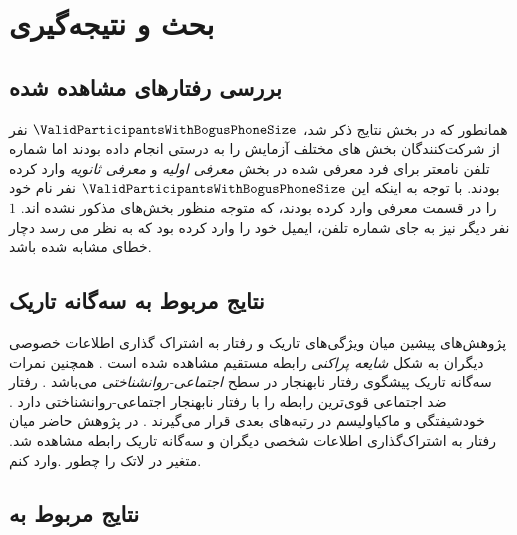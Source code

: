 \chapter{بحث و نتیجه‌گیری}
\section{بررسی رفتارهای مشاهده شده }
همانطور که در بخش نتایج ذکر شد،
$\ValidParticipantsWithBogusPhoneSize$
 نفر  از شرکت‌کنندگان 
بخش های مختلف آزمایش را به درستی انجام داده بودند اما شماره تلفن نامعتر
برای فرد معرفی شده در بخش‌ 
\textit{معرفی اولیه}
و
\textit{معرفی ثانویه}
وارد کرده بودند. با توجه به اینکه این $\ValidParticipantsWithBogusPhoneSize$
نفر نام
خود را در قسمت معرفی وارد کرده بودند، که متوجه منظور بخش‌های مذکور نشده اند.
$1$
نفر دیگر نیز به جای شماره تلفن، ایمیل خود را وارد کرده بود که به نظر می رسد دچار خطای مشابه 
شده باشد. 
\section{نتایج مربوط به سه‌گانه تاریک}
پژوهش‌های پیشین میان ویژگی‌های تاریک و رفتار
به اشتراک گذاری اطلاعات خصوصی دیگران به شکل
\textit{
    شایعه پراکنی
}
رابطه مستقیم مشاهده شده است
\!\citep{hartungBetterItsReputation2019}
\!.
همچنین نمرات سه‌گانه تاریک پیشگوی رفتار نابهنجار در سطح
\textit{
    اجتماعی-روانشناختی
}
می‌باشد
\!\citep{murisMalevolentSideHuman2017}
\!.
رفتار ضد اجتماعی قوی‌ترین رابطه را با رفتار نابهنجار اجتماعی-روانشناختی دارد
\!. خودشیفتگی
و ماکیاولیسم
در رتبه‌های بعدی قرار می‌گیرند
\!.
در پژوهش حاضر میان رفتار به اشتراک‌گذاری اطلاعات شخصی دیگران و سه‌گانه تاریک رابطه مشاهده شد.
متغیر در لاتک را چطور .وارد کنم.
\section{
    نتایج مربوط به
} 
